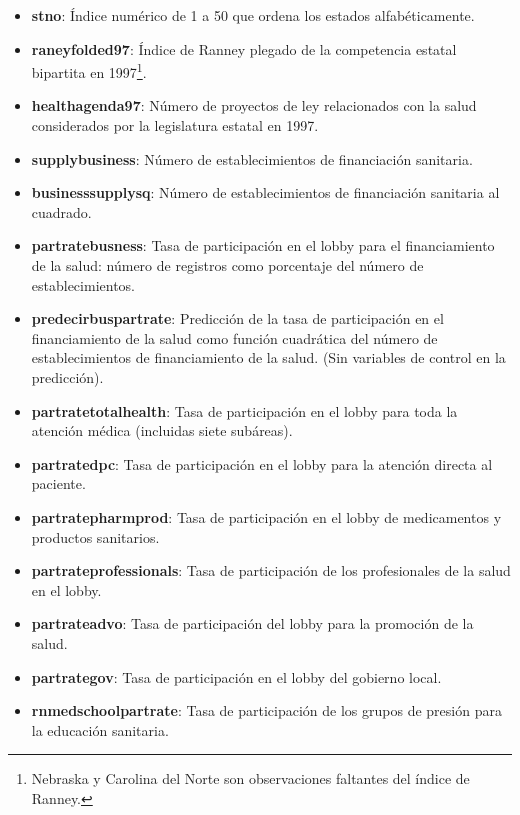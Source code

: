 \documentclass[
]{book}
\providecommand{\tightlist}{%
  \setlength{\itemsep}{0pt}\setlength{\parskip}{0pt}}
\begin{document}
\begin{itemize}
\tightlist
\item
  \textbf{stno}: Índice numérico de 1 a 50 que ordena los estados alfabéticamente.
\item
  \textbf{raneyfolded97}: Índice de Ranney plegado de la competencia estatal bipartita en 1997\footnote{Nebraska y Carolina del Norte son observaciones faltantes del índice de Ranney.}.
\item
  \textbf{healthagenda97}: Número de proyectos de ley relacionados con la salud considerados por la legislatura estatal en 1997.
\item
  \textbf{supplybusiness}: Número de establecimientos de financiación sanitaria.
\item
  \textbf{businesssupplysq}: Número de establecimientos de financiación sanitaria al cuadrado.
\item
  \textbf{partratebusness}: Tasa de participación en el lobby para el financiamiento de la salud: número de registros como porcentaje del número de establecimientos.
\item
  \textbf{predecirbuspartrate}: Predicción de la tasa de participación en el financiamiento de la salud como función cuadrática del número de establecimientos de financiamiento de la salud. (Sin variables de control en la predicción).
\item
  \textbf{partratetotalhealth}: Tasa de participación en el lobby para toda la atención médica (incluidas siete subáreas).
\item
  \textbf{partratedpc}: Tasa de participación en el lobby para la atención directa al paciente.
\item
  \textbf{partratepharmprod}: Tasa de participación en el lobby de medicamentos y productos sanitarios.
\item
  \textbf{partrateprofessionals}: Tasa de participación de los profesionales de la salud en el lobby.
\item
  \textbf{partrateadvo}: Tasa de participación del lobby para la promoción de la salud.
\item
  \textbf{partrategov}: Tasa de participación en el lobby del gobierno local.
\item
  \textbf{rnmedschoolpartrate}: Tasa de participación de los grupos de presión para la educación sanitaria.
\end{itemize}
\end{document}
